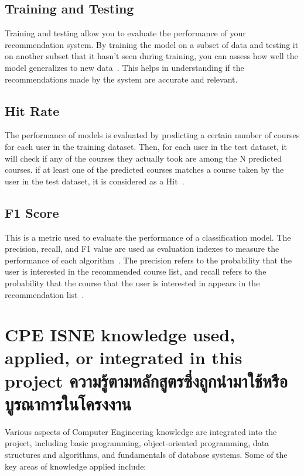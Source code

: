 \subsection{Training and Testing}

Training and testing allow you to evaluate the performance of your recommendation system. 
By training the model on a subset of data and testing it on another subset that it hasn't 
seen during training, you can assess how well the model generalizes to new data~\cite{AvinashRSonule2020UnswNb15DA}. This helps 
in understanding if the recommendations made by the system are accurate and relevant.

\subsection{Hit Rate}

The performance of models is evaluated by predicting a certain number of courses for each user in the 
training dataset. Then, for each user in the test dataset, it will check if any of the courses they 
actually took are among the N predicted courses. if at least one of the predicted courses matches a 
course taken by the user in the test dataset, it is considered as a Hit~\cite{Panigrahy2017}.

\subsection{F1 Score}

This is a metric used to evaluate the performance of a classification model. The precision, recall, 
and F1 value are used as evaluation indexes to measure the performance of each 
algorithm~\cite{yacouby-axman-2020-probabilistic}. The precision refers to the probability that the 
user is interested in the recommended course list, and recall refers to the probability that the 
course that the user is interested in appears in the recommendation list~\cite{Xu2019}.

\section{\ifenglish%
\ifcpe CPE \else ISNE \fi knowledge used, applied, or integrated in this project
\else%
ความรู้ตามหลักสูตรซึ่งถูกนำมาใช้หรือบูรณาการในโครงงาน
\fi
}

Various aspects of Computer Engineering knowledge are integrated into the project, including basic programming, object-oriented programming, data structures and algorithms, and fundamentals of database systems.
Some of the key areas of knowledge applied include:

